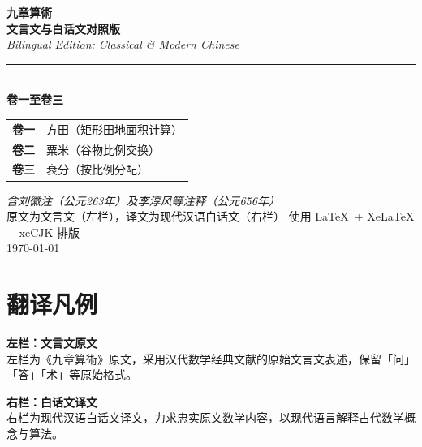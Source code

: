\documentclass[10pt,a4paper]{article}
\newlength{\lw}
\newlength{\rw}
\newcommand{\biling}[2]{%
  \par\vspace{0.2em}%
  \noindent%
  \colorbox{classicalbg}{\parbox{\dimexpr\lw-2\fboxsep\relax}{#1}}%
  \hfill%
  \colorbox{modernbg}{\parbox{\dimexpr\rw-2\fboxsep\relax}{#2}}%
  \vspace{0.2em}%
}
\begin{document}
\begin{titlepage}
\begin{center}
\vspace*{2cm}
{\fontsize{36}{42}\selectfont\bfseries\color{titlecolor} 九章算術}\\[0.5cm]
{\fontsize{16}{20}\selectfont\bfseries\color{sectioncolor} 文言文与白话文对照版}\\[0.8cm]
{\large\textit{Bilingual Edition: Classical \& Modern Chinese}}\\[1.5cm]
\rule{0.6\textwidth}{0.8pt}\\[1cm]
{\Large\bfseries 卷一至卷三}\\[0.5cm]
\begin{tabular}{cl}
\textbf{卷一} & 方田（矩形田地面积计算）\\[3pt]
\textbf{卷二} & 粟米（谷物比例交换）\\[3pt]
\textbf{卷三} & 衰分（按比例分配）\\
\end{tabular}
\vspace{1cm}
\textit{含刘徽注（公元263年）及李淳风等注释（公元656年）}\\[0.3cm]
{\small 原文为文言文（左栏），译文为现代汉语白话文（右栏）}
\vfill
{}
\vspace{1cm}
{\small 使用 \LaTeX\ + XeLaTeX + xeCJK 排版}\\[0.3cm]
\today
\end{center}
\end{titlepage}

\tableofcontents
\newpage

\section*{翻译凡例}

\biling{
\textbf{左栏：文言文原文}\\[0.2em]
左栏为《九章算術》原文，采用汉代数学经典文献的原始文言文表述，保留「问」「答」「术」等原始格式。
}{
\textbf{右栏：白话文译文}\\[0.2em]
右栏为现代汉语白话文译文，力求忠实原文数学内容，以现代语言解释古代数学概念与算法。
}
\end{document}
